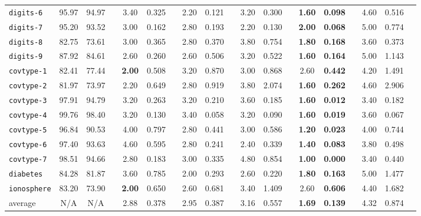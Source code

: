 \begin{subappendices}
\begin{landscape}
\begin{table}[!h]
{\begin{tabular}{lcccccccccccccccccc}
\texttt{digits-6} & 95.97 & 94.97 & & 3.40 & 0.325 & & 2.20 & 0.121 & & 3.20 & 0.300 & & \textbf{1.60} & \textbf{0.098} & & {\color{gray}4.60} & {\color{gray}0.516}\\
\texttt{digits-7} & 95.20 & 93.52 & & 3.00 & 0.162 & & 2.80 & 0.193 & & 2.20 & 0.130 & & \textbf{2.00} & \textbf{0.068} & & {\color{gray}5.00} & {\color{gray}0.774}\\
\texttt{digits-8} & 82.75 & 73.61 & & 3.00 & 0.365 & & 2.80 & 0.370 & & {\color{gray}3.80} & {\color{gray}0.754} & & \textbf{1.80} & \textbf{0.168} & & 3.60 & 0.373\\
\texttt{digits-9} & 87.92 & 84.61 & & 2.60 & 0.260 & & 2.60 & 0.506 & & 3.20 & 0.522 & & \textbf{1.60} & \textbf{0.164} & & {\color{gray}5.00} & {\color{gray}1.143}\\
\texttt{covtype-1} & 82.41 & 77.44 & & \textbf{2.00} & 0.508 & & 3.20 & 0.870 & & 3.00 & 0.868 & & 2.60 & \textbf{0.442} & & {\color{gray}4.20} & {\color{gray}1.491}\\
\texttt{covtype-2} & 81.97 & 73.97 & & 2.20 & 0.649 & & 2.80 & 0.919 & & 3.80 & 2.074 & & \textbf{1.60} & \textbf{0.262} & & {\color{gray}4.60} & {\color{gray}2.906}\\
\texttt{covtype-3} & 97.91 & 94.79 & & 3.20 & {\color{gray}0.263} & & 3.20 & 0.210 & & {\color{gray}3.60} & 0.185 & & \textbf{1.60} & \textbf{0.012} & & 3.40 & 0.182\\
\texttt{covtype-4} & 99.76 & 98.40 & & 3.20 & {\color{gray}0.130} & & 3.40 & 0.058 & & 3.20 & 0.090 & & \textbf{1.60} & \textbf{0.019} & & {\color{gray}3.60} & 0.067\\
\texttt{covtype-5} & 96.84 & 90.53 & & {\color{gray}4.00} & {\color{gray}0.797} & & 2.80 & 0.441 & & 3.00 & 0.586 & & \textbf{1.20} & \textbf{0.023} & & {\color{gray}4.00} & 0.744\\
\texttt{covtype-6} & 97.40 & 93.63 & & {\color{gray}4.60} & {\color{gray}0.595} & & 2.80 & 0.241 & & 2.40 & 0.339 & & \textbf{1.40} & \textbf{0.083} & & 3.80 & 0.498\\
\texttt{covtype-7} & 98.51 & 94.66 & & 2.80 & 0.183 & & 3.00 & 0.335 & & {\color{gray}4.80} & {\color{gray}0.854} & & \textbf{1.00} & \textbf{0.000} & & 3.40 & 0.440\\
\texttt{diabetes} & 84.28 & 81.87 & & 3.60 & 0.785 & & 2.00 & 0.293 & & 2.60 & 0.220 & & \textbf{1.80} & \textbf{0.163} & & {\color{gray}5.00} & {\color{gray}1.477}\\
\texttt{ionosphere} & 83.20 & 73.90 & & \textbf{2.00} & 0.650 & & 2.60 & 0.681 & & 3.40 & 1.409 & & 2.60 & \textbf{0.606} & & {\color{gray}4.40} & {\color{gray}1.682}\\
\midrule
average & N/A & N/A & & 2.88 & 0.378 & & 2.95 & 0.387 & & 3.16 & 0.557 & & \textbf{1.69} & \textbf{0.139} & & {\color{gray}4.32} & {\color{gray}0.874} \\
\bottomrule
\end{tabular}%
}
\end{table}


\end{landscape}
\end{subappendices}

